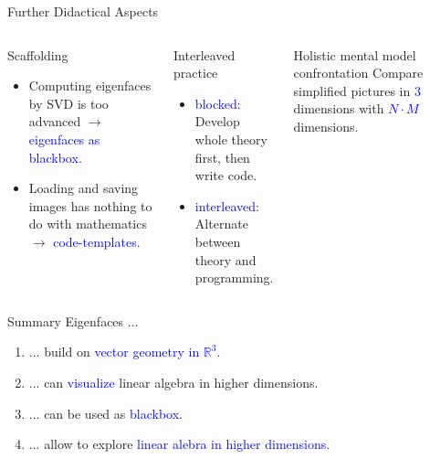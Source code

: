\documentclass[10pt,aspectratio=169,usenames,dvipsnames,handout]{beamer}
\begin{document}
\begin{frame}[fragile]{Further Didactical Aspects}
	\begin{columns}[T,onlytextwidth]
		\column{\textwidth}
		\begin{block}{Scaffolding}
			\begin{itemize}
				\item Computing eigenfaces by SVD is too advanced $\rightarrow$ \textcolor{blue}{eigenfaces as blackbox}.
				\item Loading and saving images has nothing to do with mathematics $\rightarrow$ \textcolor{blue}{code-templates}.
			\end{itemize}
		\end{block}
		\begin{block}{Interleaved practice}
			\begin{itemize}
				\item \textcolor{blue}{blocked}: Develop whole theory first, then write code.
				\item \textcolor{blue}{interleaved}: Alternate between theory and programming.
			\end{itemize}
		\end{block}
		\begin{block}{Holistic mental model confrontation}
			Compare simplified pictures in \textcolor{blue}{3} dimensions with \textcolor{blue}{$N\cdot M$} dimensions.
		\end{block}
	\end{columns}
\end{frame}

\begin{frame}[fragile]{Summary}
	Eigenfaces ...\\
	\vspace{0.5cm} \pause
	\begin{enumerate}[1.] \setlength\itemsep{0.5cm}
		\item ... build on \textcolor{blue}{vector geometry in $\mathbb R^3$}. \pause
		\item ... can \textcolor{blue}{visualize} linear algebra in higher dimensions. \pause
		\item ... can be used as \textcolor{blue}{blackbox}. \pause
		\item ... allow to explore \textcolor{blue}{linear alebra in higher dimensions}.
	\end{enumerate}
\end{frame}
	
\end{document}
